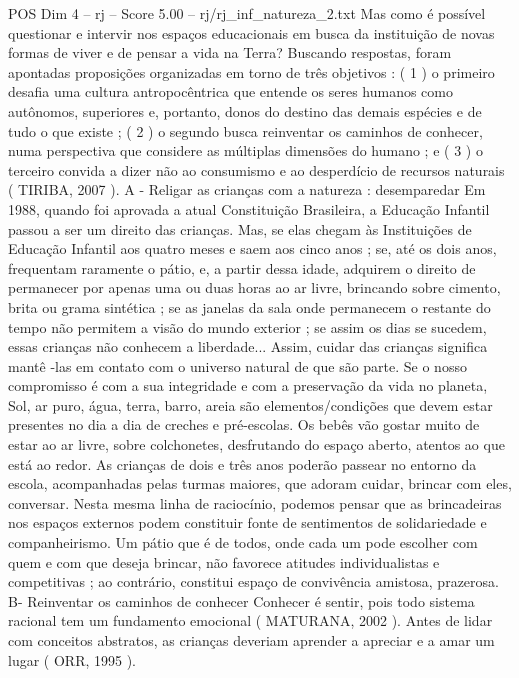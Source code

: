 \begin{textsample}{POS Dim 4 – rj – Score 5.00 – rj/rj\_inf\_natureza\_2.txt}  \label{ex:f4_pos_169}
Mas como é possível questionar e intervir nos espaços educacionais em busca da instituição de novas formas de viver e de pensar a vida na Terra?
Buscando respostas, foram apontadas proposições organizadas em torno de três objetivos : ( 1 ) o primeiro desafia uma cultura antropocêntrica que entende os seres humanos como autônomos, superiores e, portanto, donos do destino das demais espécies e de tudo o que existe ; ( 2 ) o segundo busca reinventar os caminhos de conhecer, numa perspectiva que considere as múltiplas dimensões do humano ; e ( 3 ) o terceiro convida a dizer não ao consumismo e ao desperdício de recursos naturais ( TIRIBA, 2007 ).
A - Religar as crianças com a natureza : desemparedar Em 1988, quando foi aprovada a atual Constituição Brasileira, a Educação Infantil passou a ser um direito das crianças.
Mas, se elas chegam às Instituições de Educação Infantil aos quatro meses e saem aos cinco anos ; se, até os dois anos, frequentam raramente o pátio, e, a partir dessa idade, adquirem o direito de permanecer por apenas uma ou duas horas ao ar livre, brincando sobre cimento, brita ou grama sintética ; se as janelas da sala onde permanecem o restante do tempo não permitem a visão do mundo exterior ; se assim os dias se sucedem, essas crianças não conhecem a liberdade...
Assim, cuidar das crianças significa mantê -las em contato com o universo natural de que são parte.
Se o nosso compromisso é com a sua integridade e com a preservação da vida no planeta, Sol, ar puro, água, terra, barro, areia são elementos/condições que devem estar presentes no dia a dia de creches e pré-escolas.
Os bebês vão gostar muito de estar ao ar livre, sobre colchonetes, desfrutando do espaço aberto, atentos ao que está ao redor.
As crianças de dois e três anos poderão passear no entorno da escola, acompanhadas pelas turmas maiores, que adoram cuidar, brincar com eles, conversar.
Nesta mesma linha de raciocínio, podemos pensar que as brincadeiras nos espaços externos podem constituir fonte de sentimentos de solidariedade e companheirismo.
Um pátio que é de todos, onde cada um pode escolher com quem e com que deseja brincar, não favorece atitudes individualistas e competitivas ; ao contrário, constitui espaço de convivência amistosa, prazerosa.
B- Reinventar os caminhos de conhecer Conhecer é sentir, pois todo sistema racional tem um fundamento emocional ( MATURANA, 2002 ).
Antes de lidar com conceitos abstratos, as crianças deveriam aprender a apreciar e a amar um lugar ( ORR, 1995 ).

\end{textsample}
